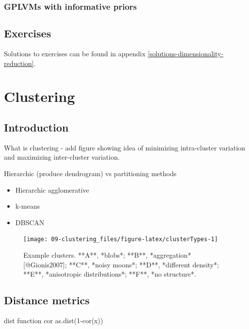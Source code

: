 \documentclass[]{book}
\providecommand{\tightlist}{%
  \setlength{\itemsep}{0pt}\setlength{\parskip}{0pt}}
\theoremstyle{definition}
\theoremstyle{definition}
\theoremstyle{definition}
\theoremstyle{remark}
\begin{document}
\subsection{GPLVMs with informative
priors}\label{gplvms-with-informative-priors}

\section{Exercises}\label{exercises-6}

Solutions to exercises can be found in appendix
\ref{solutions-dimensionality-reduction}.

\chapter{Clustering}\label{clustering}

\section{Introduction}\label{introduction}

What is clustering - add figure showing idea of minimizing intra-cluster
variation and maximizing inter-cluster variation.

Hierarchic (produce dendrogram) vs partitioning methods

\begin{itemize}
\tightlist
\item
  Hierarchic agglomerative
\item
  k-means
\item
  DBSCAN
\end{itemize}

\begin{figure}

{\centering \texttt{[image: 09-clustering\_files/figure-latex/clusterTypes-1]} 

}

\caption{Example clusters. **A**, *blobs*; **B**, *aggregation* [@Gionis2007]; **C**, *noisy moons*; **D**, *different density*; **E**, *anisotropic distributions*; **F**, *no structure*.}\label{fig:clusterTypes}
\end{figure}

\section{Distance metrics}\label{distance-metrics}

dist function cor as.dist(1-cor(x))
\end{document}
